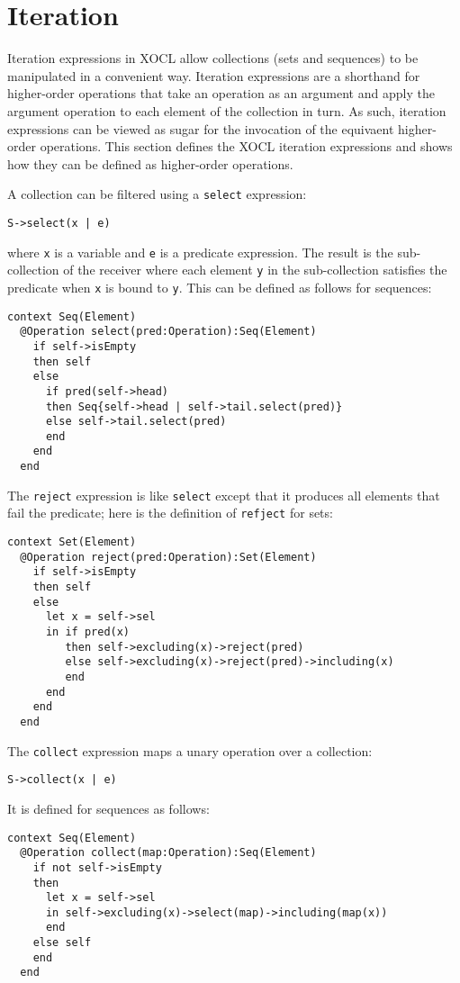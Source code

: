 \documentclass{article}
\begin{document}
\section{Iteration}

Iteration expressions in XOCL allow collections (sets and sequences) to be manipulated in a convenient
way. Iteration expressions are a shorthand for higher-order operations that take an operation as
an argument and apply the argument operation to each element of the collection in turn. As such,
iteration expressions can be viewed as sugar for the invocation of the equivaent higher-order operations.
This section defines the XOCL iteration expressions and shows how they can be defined as higher-order
operations.

A collection can be filtered using a {\tt select} expression:
\begin{verbatim}
S->select(x | e)
\end{verbatim}
where {\tt x} is a variable and {\tt e} is a predicate expression. The result is the sub-collection
of the receiver where each element {\tt y} in the sub-collection satisfies the predicate when {\tt x} is 
bound to {\tt y}. This can be defined as follows for sequences:
\begin{verbatim}
context Seq(Element)
  @Operation select(pred:Operation):Seq(Element)
    if self->isEmpty
    then self
    else 
      if pred(self->head)
      then Seq{self->head | self->tail.select(pred)}
      else self->tail.select(pred)
      end
    end
  end
\end{verbatim}
The {\tt reject} expression is like {\tt select} except that it produces all elements that fail
the predicate; here is the definition of {\tt refject} for sets:
\begin{verbatim}
context Set(Element)
  @Operation reject(pred:Operation):Set(Element)
    if self->isEmpty
    then self
    else 
      let x = self->sel
      in if pred(x)
         then self->excluding(x)->reject(pred)
         else self->excluding(x)->reject(pred)->including(x)
         end
      end
    end
  end
\end{verbatim}
The {\tt collect} expression maps a unary operation over a collection:
\begin{verbatim}
S->collect(x | e)
\end{verbatim}
It is defined for sequences as follows:
\begin{verbatim}
context Seq(Element)
  @Operation collect(map:Operation):Seq(Element)
    if not self->isEmpty
    then 
      let x = self->sel
      in self->excluding(x)->select(map)->including(map(x))
      end
    else self
    end
  end
\end{verbatim}
\end{document}
